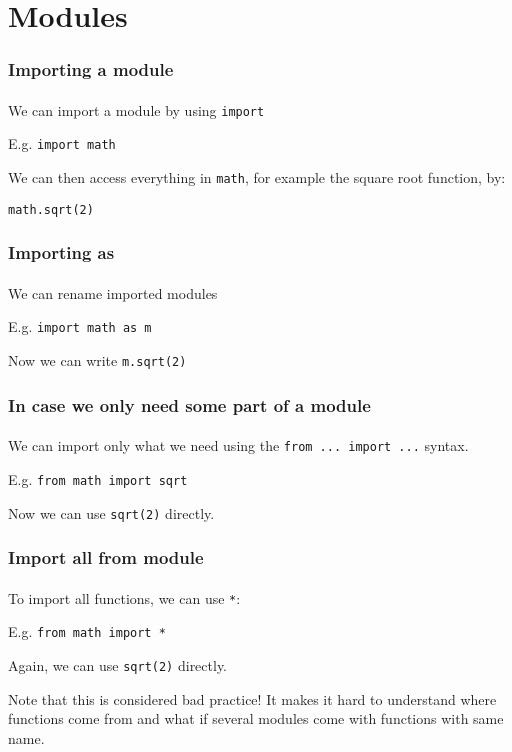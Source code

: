 \section{Modules} %
\label{sec:modules}

\begin{frame}[fragile]\frametitle{Importing a module}
    \framesubtitle{}

    We can import a module by using \texttt{import}

    \vfill

    E.g. \texttt{import math}

    \vfill

    We can then access everything in \texttt{math}, for example the square root
    function, by:

    \vfill

    \texttt{math.sqrt(2)}


\end{frame}

\begin{frame}[fragile]\frametitle{Importing as}
    \framesubtitle{}

    We can rename imported modules

    \vfill

    E.g. \texttt{import math as m}

    \vfill

    Now we can write \texttt{m.sqrt(2)}

\end{frame}

\begin{frame}\frametitle{In case we only need some part of a module}
    \framesubtitle{}

    We can import only what we need using the \texttt{from ... import ...} syntax.

    \vfill

    E.g. \texttt{from math import sqrt}

    \vfill

    Now we can use \texttt{sqrt(2)} directly.

\end{frame}

\begin{frame}\frametitle{Import all from module}
    \framesubtitle{}

    To import all functions, we can use \texttt{*}:

    \vfill

    E.g. \texttt{from math import *}

    \vfill

    Again, we can use \texttt{sqrt(2)} directly.

    \vfill

    Note that this is considered bad practice!
    It makes it hard to understand where functions come from and what if several modules come with functions with same name.

\end{frame}

